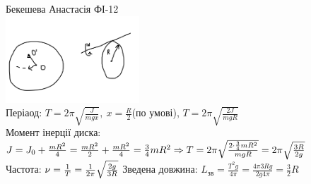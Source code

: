 \documentclass[a4paper,12pt]{article}
\begin{document}
	Бекешева Анастасія ФІ-12\\
	\includegraphics[width=5cm]{graph9}\\
	Періаод: $T=2\pi\sqrt{\frac{J}{mgx}},\>x=\frac R2$(по умові), $T=2\pi\sqrt{\frac{2J}{mgR}}$\\Момент інерції диска: $J=J_0+\frac {mR^2}4=\frac {mR^2}2+\frac {mR^2}4=\frac34mR^2\\\Rightarrow T=2\pi\sqrt{\frac{2\cdot\frac34mR^2}{mgR}}=2\pi\sqrt{\frac{3R}{2g}}$\\Частота: $\nu=\frac1T=\frac1{2\pi}\sqrt{\frac{2g}{3R}}\\$ Зведена довжина: $L_\textrm{зв}=\frac{T^2g}{4\pi}=\frac{4\pi 3Rg}{2g4\pi}=\frac32R$ 
\end{document}
